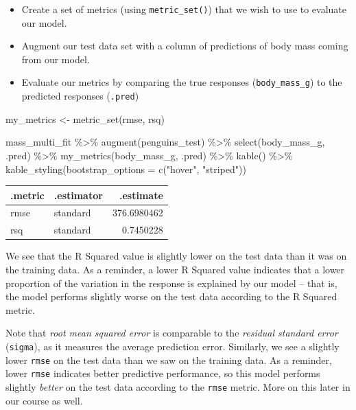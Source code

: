 \documentclass[
  letterpaper,
  DIV=11,
  numbers=noendperiod]{scrartcl}
\newenvironment{Shaded}{\begin{snugshade}}{\end{snugshade}}
\newcommand{\AttributeTok}[1]{\textcolor[rgb]{0.40,0.45,0.13}{#1}}
\newcommand{\FunctionTok}[1]{\textcolor[rgb]{0.28,0.35,0.67}{#1}}
\newcommand{\NormalTok}[1]{\textcolor[rgb]{0.00,0.23,0.31}{#1}}
\newcommand{\OtherTok}[1]{\textcolor[rgb]{0.00,0.23,0.31}{#1}}
\newcommand{\SpecialCharTok}[1]{\textcolor[rgb]{0.37,0.37,0.37}{#1}}
\newcommand{\StringTok}[1]{\textcolor[rgb]{0.13,0.47,0.30}{#1}}
\providecommand{\tightlist}{%
  \setlength{\itemsep}{0pt}\setlength{\parskip}{0pt}}\usepackage{longtable,booktabs,array}
\begin{document}
\begin{itemize}
\tightlist
\item
  Create a set of metrics (using \texttt{metric\_set()}) that we wish to
  use to evaluate our model.
\item
  Augment our test data set with a column of predictions of body mass
  coming from our model.
\item
  Evaluate our metrics by comparing the true responses
  (\texttt{body\_mass\_g}) to the predicted responses (\texttt{.pred})
\end{itemize}

\begin{Shaded}
\begin{Highlighting}[]
\NormalTok{my\_metrics }\OtherTok{\textless{}{-}} \FunctionTok{metric\_set}\NormalTok{(rmse, rsq)}

\NormalTok{mass\_multi\_fit }\SpecialCharTok{\%\textgreater{}\%}
  \FunctionTok{augment}\NormalTok{(penguins\_test) }\SpecialCharTok{\%\textgreater{}\%}
  \FunctionTok{select}\NormalTok{(body\_mass\_g, .pred) }\SpecialCharTok{\%\textgreater{}\%}
  \FunctionTok{my\_metrics}\NormalTok{(body\_mass\_g, .pred) }\SpecialCharTok{\%\textgreater{}\%}
  \FunctionTok{kable}\NormalTok{() }\SpecialCharTok{\%\textgreater{}\%}
  \FunctionTok{kable\_styling}\NormalTok{(}\AttributeTok{bootstrap\_options =} \FunctionTok{c}\NormalTok{(}\StringTok{"hover"}\NormalTok{, }\StringTok{"striped"}\NormalTok{))}
\end{Highlighting}
\end{Shaded}

\begin{longtable}[t]{llr}
\toprule
.metric & .estimator & .estimate\\
\midrule
rmse & standard & 376.6980462\\
rsq & standard & 0.7450228\\
\bottomrule
\end{longtable}

We see that the R Squared value is slightly lower on the test data than
it was on the training data. As a reminder, a lower R Squared value
indicates that a lower proportion of the variation in the response is
explained by our model -- that is, the model performs slightly worse on
the test data according to the R Squared metric.

Note that \emph{root mean squared error} is comparable to the
\emph{residual standard error} (\texttt{sigma}), as it measures the
average prediction error. Similarly, we see a slightly lower
\texttt{rmse} on the test data than we saw on the training data. As a
reminder, lower \texttt{rmse} indicates better predictive performance,
so this model performs slightly \emph{better} on the test data according
to the \texttt{rmse} metric. More on this later in our course as well.
\end{document}
